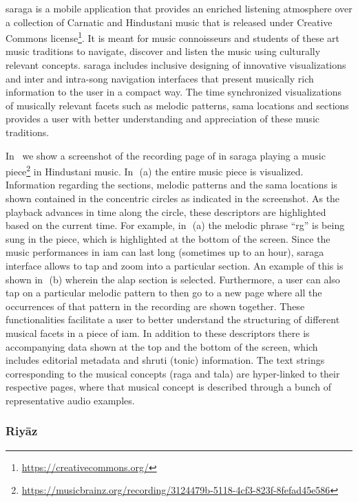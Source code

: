 \Gls{saraga} is a mobile application that provides an enriched listening atmosphere over a collection of Carnatic and Hindustani music that is released under Creative Commons license\footnote{\url{https://creativecommons.org/}}. It is meant for music connoisseurs and students of these art music traditions to navigate, discover and listen the music using culturally relevant concepts. \gls{saraga} includes inclusive designing of innovative visualizations and inter and intra-song navigation interfaces that present musically rich information to the user in a compact way. The time synchronized visualizations of musically relevant facets such as melodic patterns, \gls{sama} locations and sections provides a user with better understanding and appreciation of these music traditions.

In~ we show a screenshot of the recording page of in \gls{saraga} playing a music piece\footnote{\url{https://musicbrainz.org/recording/3124479b-5118-4cf3-823f-8fefad45e586}} in Hindustani music. In~\,(a) the entire music piece is visualized. Information regarding the sections, melodic patterns and the \gls{sama} locations is shown contained in the concentric circles as indicated in the screenshot. As the playback advances in time along the circle, these descriptors are highlighted based on the current time. For example, in~\,(a) the melodic phrase ``rg'' is being sung in the piece, which is highlighted at the bottom of the screen. Since the music performances in \gls{iam} can last long (sometimes up to an hour), \gls{saraga} interface allows to tap and zoom into a particular section. An example of this is shown in~\,(b) wherein the \gls{alap} section is selected. Furthermore, a user can also tap on a particular melodic pattern to then go to a new page where all the occurrences of that pattern in the recording are shown together. These functionalities facilitate a user to better understand the structuring of different musical facets in a piece of \gls{iam}. In addition to these descriptors there is accompanying data shown at the top and the bottom of the screen, which includes editorial metadata and \gls{shruti} (tonic) information. The text strings corresponding to the musical concepts (\gls{raga} and \gls{tala}) are hyper-linked to their respective pages, where that musical concept is described through a bunch of representative audio examples. 


\subsubsection{Riy\={a}z}
\label{sec:riyaz}




